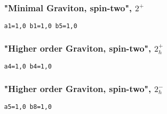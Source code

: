 \documentclass[aps,superscriptaddress,nofootinbib]{revtex4}
\begin{document}
\subsubsection{"Minimal Graviton, spin-two", $2^+$}


\verb|a1=1,0 b1=1,0 b5=1,0|

\subsubsection{"Higher order Graviton, spin-two", $2^+_h$}

\verb|a4=1,0 b4=1,0|

\subsubsection{"Higher order Graviton, spin-two", $2^-_h$}

\verb|a5=1,0 b8=1,0|
\end{document}
